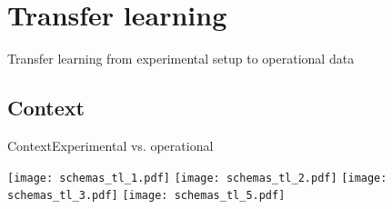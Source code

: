 \section{Transfer learning}

\begingroup
{}  %
\begin{frame}[noframenumbering]{}
    \centering
    \vspace{3cm}
    \Huge
    \textcolor{myblue}{Transfer learning from experimental setup to operational data}
\end{frame}
\endgroup

\subsection{Context}

\begin{frame}{Context}{Experimental vs. operational}
    
    \renewcommand{\ratio}{0.9}
    \begin{overprint}
        \centering\texttt{[image: schemas\_tl\_1.pdf]}
        \centering\texttt{[image: schemas\_tl\_2.pdf]}
        \centering\texttt{[image: schemas\_tl\_3.pdf]}
        \centering\texttt{[image: schemas\_tl\_5.pdf]}
    \end{overprint}

\end{frame}


